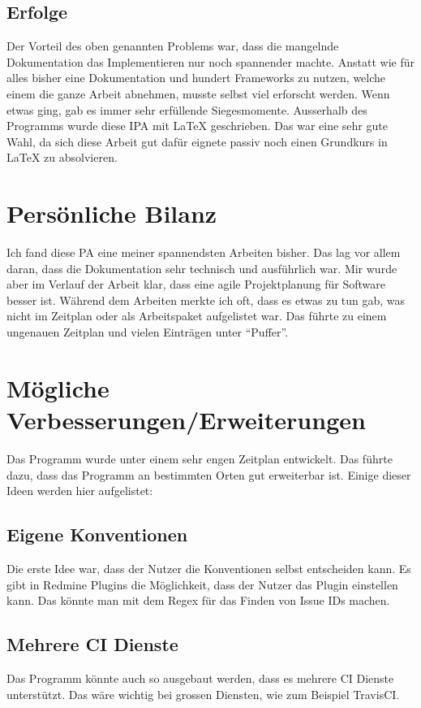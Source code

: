 \subsection{Erfolge}
Der Vorteil des oben genannten Problems war, dass die mangelnde Dokumentation das Implementieren nur noch
spannender machte. Anstatt wie für alles bisher eine Dokumentation und hundert Frameworks zu nutzen, welche einem
die ganze Arbeit abnehmen, musste selbst viel erforscht werden. Wenn etwas ging, gab es immer sehr erfüllende
Siegesmomente. \newline
Ausserhalb des Programms wurde diese IPA mit LaTeX geschrieben. Das war eine sehr gute Wahl, da sich diese
Arbeit gut dafür eignete passiv noch einen Grundkurs in LaTeX zu absolvieren.

\section{Persönliche Bilanz}
Ich fand diese PA eine meiner spannendsten Arbeiten bisher. Das lag vor allem daran, dass die Dokumentation sehr
technisch und ausführlich war. Mir wurde aber im Verlauf der Arbeit klar, dass eine agile Projektplanung für
Software besser ist. Während dem Arbeiten merkte ich oft, dass es etwas zu tun gab, was nicht im Zeitplan oder
als Arbeitspaket aufgelistet war. Das führte zu einem ungenauen Zeitplan und vielen Einträgen unter
\enquote{Puffer}.

\section{Mögliche Verbesserungen/Erweiterungen}
Das Programm wurde unter einem sehr engen Zeitplan entwickelt. Das führte dazu, dass das Programm an bestimmten
Orten gut erweiterbar ist. Einige dieser Ideen werden hier aufgelistet:
\subsection{Eigene Konventionen}
Die erste Idee war, dass der Nutzer die Konventionen selbst entscheiden kann. Es gibt in Redmine Plugins die
Möglichkeit, dass der Nutzer das Plugin einstellen kann. Das könnte man mit dem Regex für das Finden von Issue
IDs machen.
\subsection{Mehrere CI Dienste}
Das Programm könnte auch so ausgebaut werden, dass es mehrere CI Dienste unterstützt. Das wäre wichtig bei
grossen Diensten, wie zum Beispiel TravisCI.
